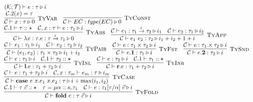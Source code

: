 \documentclass[fleqn]{article}
\begin{document}
\[
\begin{array}{l}
    (\mathcal{K}; \mathcal{T}) \vdash e : \tau \triangleright i \\
    \infer[\textsc{TyVar}]{\mathcal{C} \vdash x : \tau \triangleright 0}{\mathcal{C}.2(x)=\tau} \hspace{1em}
    \infer[\textsc{TyConst}]{\mathcal{C} \vdash EC : type(EC) \triangleright 0}{} \\
    \infer[\textsc{TyAbs}]{\mathcal{C} \vdash \lambda x:\tau. e : \tau \xrightarrow{i} \tau_1 \triangleright 0}{\mathcal{C}.1 \vdash \tau :: \star & \mathcal{C},x:\tau \vdash e : \tau_1 \triangleright i} \hspace{1em}
    \infer[\textsc{TyApp}]{\mathcal{C} \vdash e_1~e_2 : \tau_2 \triangleright i_1 + i_2 + 1 + i}{\mathcal{C} \vdash e_1 : \tau_1 \xrightarrow{i} \tau_2 \triangleright i_1 & \mathcal{C} \vdash e_2 : \tau_1 \triangleright i_2} \\
    \infer[\textsc{TyPair}]{\mathcal{C} \vdash (e_1,e_2) : \tau_1 \times \tau_2 \triangleright i_1 + i_2}{\mathcal{C} \vdash e_1 : \tau_1 \triangleright i_1 & \mathcal{C} \vdash e_2 : \tau_2 \triangleright i_2} \hspace{1em}
    \infer[\textsc{TyFst}]{\mathcal{C} \vdash e.\mathbf{1} : \tau_1 \triangleright i}{\mathcal{C} \vdash e : \tau_1 \times \tau_2 \triangleright i} \hspace{1em}
    \infer[\textsc{TySnd}]{\mathcal{C} \vdash e.\mathbf{2} : \tau_2 \triangleright i}{\mathcal{C} \vdash e : \tau_1 \times \tau_2 \triangleright i} \\
    \infer[\textsc{TyInl}]{\mathcal{C} \vdash \mathbf{l}.e : \tau_1 + \tau_2 \triangleright i}{\mathcal{C} \vdash e : \tau_1 \triangleright i & \mathcal{C}.1 \vdash \tau_2 :: \star} \hspace{1em}
    \infer[\textsc{TyInr}]{\mathcal{C} \vdash \mathbf{r}.e : \tau_1 + \tau_2 \triangleright i}{\mathcal{C} \vdash e : \tau_2 \triangleright i & \mathcal{C}.1 \vdash \tau_1 :: \star} \\
    \infer[\textsc{TyCase}]{\mathcal{C} \vdash \mathbf{case}~e~x.e_1~x.e_2 : \tau \triangleright i + \max(i_1,i_2)}{\mathcal{C} \vdash e : \tau_1 + \tau_2 \triangleright i & \mathcal{C},x:\tau_m \vdash e_m : \tau \triangleright i_m} \\
    \infer[\textsc{TyFold}]{\mathcal{C} \vdash \mathbf{fold}~e : \tau~\vec{c} \triangleright i}{\mathcal{C}.1 \vdash \tau~\vec{c} :: \star & \tau = \mu \alpha :: \kappa. \tau_1 & \mathcal{C} \vdash e : \tau_1[\tau/\alpha]~\vec{c} \triangleright i} \\

\end{array}\]
\end{document}
